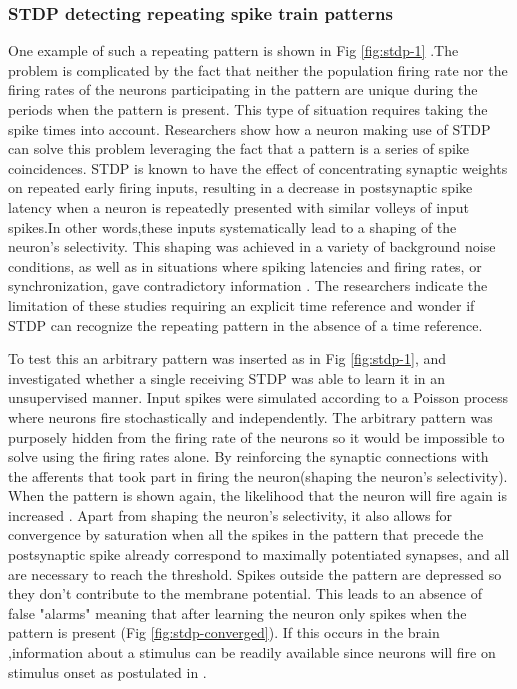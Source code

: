 \documentclass[12pt]{report}
\begin{document}
\subsubsection{STDP detecting repeating spike train patterns}
One example of such a repeating pattern is shown in Fig \ref{fig:stdp-1} .The problem is complicated by the fact that neither the population firing rate nor the firing rates of the neurons participating in the pattern are unique during the periods when the pattern is present. This type of situation requires taking the spike times into account. Researchers show how a neuron making use of STDP can solve this problem leveraging the fact that a pattern is a series of spike coincidences. STDP is known to have the effect of concentrating synaptic weights on repeated early firing inputs, resulting in a decrease in postsynaptic spike latency when a neuron is repeatedly presented with similar volleys of input spikes.In other words,these inputs systematically lead to a shaping of the neuron's selectivity. This shaping was achieved in a variety of background noise conditions, as well as in situations where spiking latencies and firing rates, or synchronization, gave contradictory information \cite{rossum2000} \cite{guyonneau2005} \cite{masquelier2007} . The researchers indicate the limitation of these studies requiring an explicit time reference and wonder if STDP can recognize the repeating pattern in the absence of a time reference.

To test this an arbitrary pattern was inserted as in Fig \ref{fig:stdp-1}, and investigated whether a single receiving STDP was able to learn it in an unsupervised manner. Input spikes were simulated according to a Poisson process where neurons fire stochastically and independently. The arbitrary pattern was purposely hidden from the firing rate of the neurons so it would be impossible to solve using the firing rates alone. By reinforcing the synaptic connections with the afferents that took part in firing the neuron(shaping the neuron's selectivity). When the pattern is shown again, the likelihood that the neuron will fire again is increased . Apart from shaping the neuron's selectivity, it also allows for convergence by saturation when all the spikes in the pattern that precede the postsynaptic spike already correspond to maximally potentiated synapses, and all are necessary to reach the threshold. Spikes outside the pattern are depressed so they don't contribute to the membrane potential. This leads to an absence of false "alarms" meaning that after learning the neuron only spikes when the pattern is present (Fig \ref{fig:stdp-converged}). If this occurs in the brain ,information about a stimulus can be readily available since neurons will fire on stimulus onset as postulated in \cite{thorpe2001}. 
\end{document}
